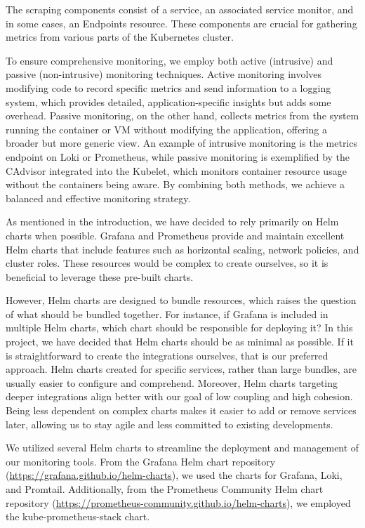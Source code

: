 The scraping components consist of a service, an associated service monitor, and in some cases, an Endpoints resource. These components are crucial for gathering metrics from various parts of the Kubernetes cluster.

To ensure comprehensive monitoring, we employ both active (intrusive) and passive (non-intrusive) monitoring techniques. Active monitoring involves modifying code to record specific metrics and send information to a logging system, which provides detailed, application-specific insights but adds some overhead. Passive monitoring, on the other hand, collects metrics from the system running the container or VM without modifying the application, offering a broader but more generic view. An example of intrusive monitoring is the metrics endpoint on Loki or Prometheus, while passive monitoring is exemplified by the CAdvisor integrated into the Kubelet, which monitors container resource usage without the containers being aware. By combining both methods, we achieve a balanced and effective monitoring strategy.

As mentioned in the introduction, we have decided to rely primarily on Helm charts when possible. Grafana and Prometheus provide and maintain excellent Helm charts that include features such as horizontal scaling, network policies, and cluster roles. These resources would be complex to create ourselves, so it is beneficial to leverage these pre-built charts.

However, Helm charts are designed to bundle resources, which raises the question of what should be bundled together. For instance, if Grafana is included in multiple Helm charts, which chart should be responsible for deploying it? In this project, we have decided that Helm charts should be as minimal as possible. If it is straightforward to create the integrations ourselves, that is our preferred approach. Helm charts created for specific services, rather than large bundles, are usually easier to configure and comprehend. Moreover, Helm charts targeting deeper integrations align better with our goal of low coupling and high cohesion. Being less dependent on complex charts makes it easier to add or remove services later, allowing us to stay agile and less committed to existing developments.

We utilized several Helm charts to streamline the deployment and management of our monitoring tools. From the Grafana Helm chart repository (\url{https://grafana.github.io/helm-charts}), we used the charts for Grafana, Loki, and Promtail. Additionally, from the Prometheus Community Helm chart repository (\url{https://prometheus-community.github.io/helm-charts}), we employed the kube-prometheus-stack chart.

